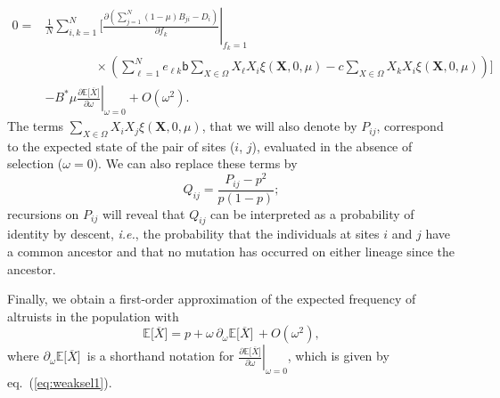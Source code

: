 \documentclass[11pt, letterpaper]{article}
\renewcommand{\eqref}[1]{\textup{{\normalfont eq.~(\ref{#1}}\normalfont)}}
\newcommand{\ie}{\textit{i.\!e.\!}}
\newcommand{\deriv}[2]{\partial_{#2}\!{#1}\,}
\newcommand{\derivv}[3]{\left.\frac{\partial #1}{\partial #2}\right |_{#3=0}} %
\newcommand{\derivvv}[3]{\left.\frac{\partial #1}{\partial #2}\right |_{#3}} %
\newcommand{\Esp}[1]{\mathbb{E}\big[ #1\big]}%
\newcommand{\bigO}[1]{O\left( #1 \right)}
\newcommand{\bb}{\mathsf{b}}
\begin{document}
%
\begin{equation}\label{eq:weaksel1}
\begin{split}
0 =&  \frac{1}{N}  \sum_{i,k=1}^N \Bigg[  \derivvv{\left(\sum_{j=1}^N (1-\mu) B_{ji}  - D_i \right)}{f_k}{f_k=1}  \\ 
%
&  \qquad \qquad \times \left( \sum_{\ell =1}^N e_{\ell k} \bb \sum_{X\in \Omega} X_{\ell} X_i \xi(\mathbf{X}, 0, \mu) - c \sum_{X\in \Omega} X_k X_i \xi(\mathbf{X}, 0, \mu) \right)  \Bigg] \\ 
%
%
%
& - B^* \mu \derivv{\Esp{\overline{X}}}{\omega}{\omega} 
%
+ \bigO{\omega^2}. 
\end{split}
\end{equation}
The terms $\sum_{X\in\Omega} X_i X_j \xi(\mathbf{X}, 0, \mu)$, that we will also denote by $P_{ij}$, correspond to the expected state of the pair of sites ($i$, $j$), evaluated in the absence of selection ($\omega = 0$). We can also replace these terms by 
\begin{equation}\label{eq:QP}
Q_{ij} = \frac{P_{ij} - p^2}{p (1-p)};
\end{equation}
recursions on $P_{ij}$ will reveal that $Q_{ij}$ can be interpreted as a probability of identity by descent, \ie, the probability that the individuals at sites $i$ and $j$ have a common ancestor and that no mutation has occurred on either lineage since the ancestor. 

Finally, we obtain a first-order approximation of the expected frequency of altruists in the population with 
\begin{equation}\label{eq:EXgeneric}
\Esp{\overline{X}} = p + \omega \, \deriv{\Esp{\overline{X}}}{\omega} + \bigO{\omega^2},
\end{equation}
where $\deriv{\Esp{\overline{X}}}{\omega}$ is a shorthand notation for $\derivv{\Esp{\overline{X}}}{\omega}{\omega}$, which is given by \eqref{eq:weaksel1}. 
\end{document}
